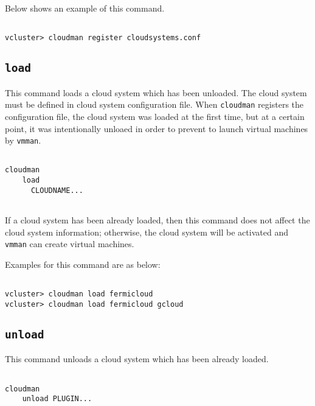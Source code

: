 \documentclass[11pt]{article}
\def \ttt{\texttt}
\def \vb{\verb}
\begin{document}
Below shows an example of this command.

\begin{Verbatim}[fontfamily=courier, fontsize = \small, obeytabs
=true, tabsize=4, frame=lines]

vcluster> cloudman register cloudsystems.conf

\end{Verbatim}



\subsection{\ttt{load}}
This command loads a cloud system which has been unloaded. The cloud system must be defined in cloud system configuration file. When \vb+cloudman+ registers the configuration file, the cloud system was loaded at the first time, but at a certain point, it was intentionally unloaed in order to prevent to launch virtual machines by \vb+vmman+. 

\begin{Verbatim}[fontfamily=courier, fontsize = \small, obeytabs
=true, tabsize=4, frame=lines]

cloudman 
    load
      CLOUDNAME... 
      
\end{Verbatim}

If a cloud system has been already loaded, then this command does not affect the cloud system information; otherwise, the cloud system will be activated and \vb+vmman+ can create virtual machines. 

Examples for this command are as below:


\begin{Verbatim}[fontfamily=courier, fontsize = \small, obeytabs
=true, tabsize=4, frame=lines]

vcluster> cloudman load fermicloud
vcluster> cloudman load fermicloud gcloud

\end{Verbatim}


\subsection{\ttt{unload}}
This command unloads a cloud system which has been already loaded. 

\begin{Verbatim}[fontfamily=courier, fontsize = \small, obeytabs
=true, tabsize=4, frame=lines]

cloudman 
    unload PLUGIN...
      
\end{Verbatim}
\end{document}
